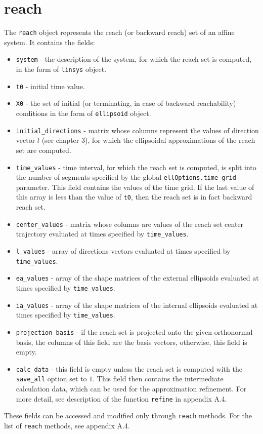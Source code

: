 \section{reach}
The {\tt reach} object represents the reach (or backward reach)
set of an affine system. It contains the fields:
\begin{itemize}
\item {\tt system} - the description of the system, for which the reach set
is computed, in the form of {\tt linsys} object.
\item {\tt t0} - initial time value.
\item {\tt X0} - the set of initial (or terminating, in case of backward
reachability) conditions in the form of {\tt ellipsoid}
object.
\item {\tt initial\_directions} - matrix whose columns represent the values
of direction vector $l$ (see chapter 3), for which the ellipsoidal
approximations of the reach set are computed.
\item {\tt time\_values} - time interval, for which the reach set is computed,
is split into the number of segments specified by the global
{\tt ellOptions.time\_grid} parameter. This field contains the values
of the time grid. If the last value of this array is less than the value
of {\tt t0}, then the reach set is in fact backward reach set.
\item {\tt center\_values} - matrix whose columns are values of the reach set
center trajectory evaluated at times specified by {\tt time\_values}.
\item {\tt l\_values} - array of directions vectors evaluated at times
specified by {\tt time\_values}.
\item {\tt ea\_values} - array of the shape matrices of the external ellipsoids
evaluated at times specified by {\tt time\_values}.
\item {\tt ia\_values} - array of the shape matrices of the internal ellipsoids
evaluated at times specified by {\tt time\_values}.
\item {\tt projection\_basis} - if the reach set is projected onto the given
orthonormal basis, the columns of this field are the basis vectors, otherwise,
this field is empty.
\item {\tt calc\_data} - this field is empty unless the reach set is computed
with the {\tt save\_all} option set to $1$. This field then contains the
intermediate calculation data, which can be used for the approximation
refinement. For more detail, see description of the function
{\tt refine} in appendix A.4.
\end{itemize}
These fields can be accessed and modified only through {\tt reach} methods.
For the list of {\tt reach} methods, see appendix A.4.